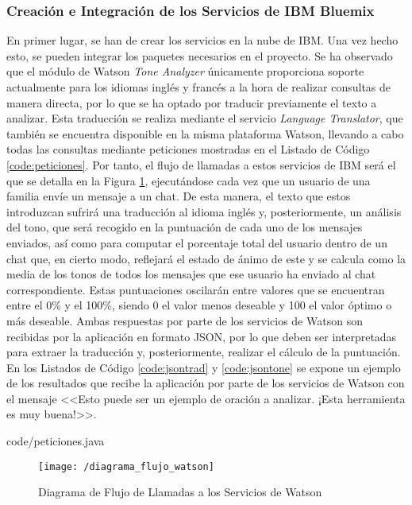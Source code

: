 \subsubsection{Creación e Integración de los Servicios de IBM Bluemix}
En primer lugar, se han de crear los servicios en la nube de IBM. Una vez hecho esto, se pueden integrar los paquetes necesarios en el proyecto. Se ha observado que el módulo de Watson \textit{Tone Analyzer} únicamente proporciona soporte actualmente para los idiomas inglés y francés a la hora de realizar consultas de manera directa, por lo que se ha optado por traducir previamente el texto a analizar. Esta traducción se realiza mediante el servicio \textit{Language Translator}, que también se encuentra disponible en la misma plataforma Watson, llevando a cabo todas las consultas mediante peticiones mostradas en el Listado de Código \ref{code:peticiones}. Por tanto, el flujo de llamadas a estos servicios de IBM será el que se detalla en la Figura \ref{fig:diaflujo}, ejecutándose cada vez que un usuario de una familia envíe un mensaje a un chat. De esta manera, el texto que estos introduzcan sufrirá una traducción al idioma inglés y, posteriormente, un análisis del tono, que será recogido en la puntuación de cada uno de los mensajes enviados, así como para computar el porcentaje total del usuario dentro de un chat que, en cierto modo, reflejará el estado de ánimo de este y se calcula como la media de los tonos de todos los mensajes que ese usuario ha enviado al chat correspondiente. Estas puntuaciones oscilarán entre valores que se encuentran entre el 0\% y el 100\%, siendo 0 el valor menos deseable y 100 el valor óptimo o más deseable. Ambas respuestas por parte de los servicios de Watson son recibidas por la aplicación en formato \acf{JSON}, por lo que deben ser interpretadas para extraer la traducción y, posteriormente, realizar el cálculo de la puntuación. En los Listados de Código \ref{code:jsontrad} y \ref{code:jsontone} se expone un ejemplo de los resultados que recibe la aplicación por parte de los servicios de Watson con el mensaje <<Esto puede ser un ejemplo de oración a analizar. ¡Esta herramienta es muy buena!>>.


						{code/peticiones.java}

\begin{figure}[!h]
	\begin{center}
		\texttt{[image: /diagrama\_flujo\_watson]}
		\caption{Diagrama de Flujo de Llamadas a los Servicios de Watson}
		\label{fig:diaflujo}
	\end{center}
\end{figure}

